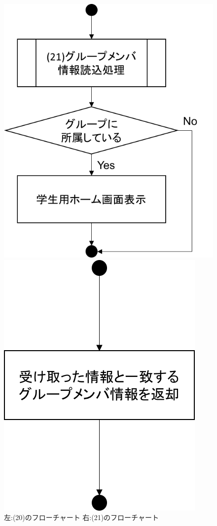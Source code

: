 \begin{figure}[htbp]
 \begin{minipage}{0.5\hsize}
  \begin{center}
   \includegraphics[width=0.75\linewidth,clip]{./img/flow/20.png}
  \end{center}
 \end{minipage}
 \begin{minipage}{0.5\hsize}
  \begin{center}
   \includegraphics[width=0.5\linewidth,clip]{./img/flow/21.png}
  \end{center}
 \end{minipage}
 \caption{左:(20)のフローチャート 右:(21)のフローチャート}\label{fig:20to21}
\end{figure}

